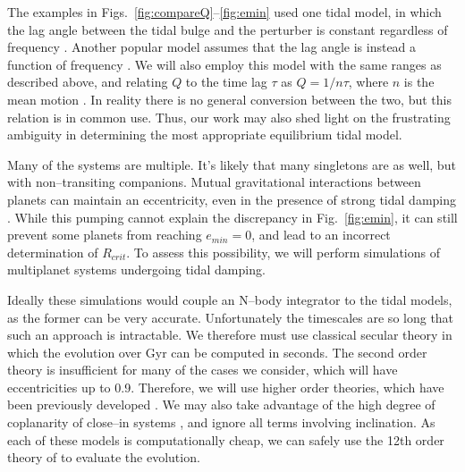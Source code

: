 The examples in Figs.~\ref{fig:compareQ}--\ref{fig:emin} used one
tidal model, in which the lag angle between the tidal bulge and the
perturber is constant regardless of frequency
\citep[e.g.][]{GoldreichSoter66,Jackson08}.  Another popular model
assumes that the lag angle is instead a function of frequency
\citep[e.g.][]{Hut81,Matsumura10}.  We will also employ this model
with the same ranges as described above, and relating $Q$ to the time
lag $\tau$ as $Q = 1/n\tau$, where $n$ is the mean motion
\citep[e.g.][]{Correia12}.  In reality there is no general conversion between
the two, but this relation is in common use.  Thus, our work may also
shed light on the frustrating ambiguity in determining the most
appropriate equilibrium tidal model.

\medskip
{\centerline{}}
\smallskip

Many of the \kepler systems are multiple.  It's likely that many
singletons are as well, but with non--transiting companions.  Mutual
gravitational interactions between planets can maintain an
eccentricity, even in the presence of strong tidal damping
\citep{MardlingLin02,GreenbergVanLaerhoven11,Correia12}.  While this
pumping cannot explain the discrepancy in Fig.~\ref{fig:emin}, it can
still prevent some planets from reaching $e_{min} = 0$, and lead to an
incorrect determination of $R_{crit}$.  To assess this possibility, we
will perform simulations of multiplanet systems undergoing tidal
damping.

Ideally these simulations would couple an N--body integrator to the
tidal models, as the former can be very accurate.  Unfortunately the
timescales are so long that such an approach is intractable.  We
therefore must use classical secular theory in which the evolution over
Gyr can be computed in seconds.  The second order theory is
insufficient for many of the cases we consider, which will have
eccentricities up to 0.9.  Therefore, we will use higher order
theories, which have been previously developed
\citep[e.g.][]{Ford00,VerasArmitage04,LibertHenrard05}.  We may also
take advantage of the high degree of coplanarity of close--in
\kepler systems \cite{Fabrycky12}, and ignore all terms involving
inclination.  As each of these models is computationally cheap, we can
safely use the 12th order theory of \cite{LibertHenrard05} to evaluate
the evolution.  

